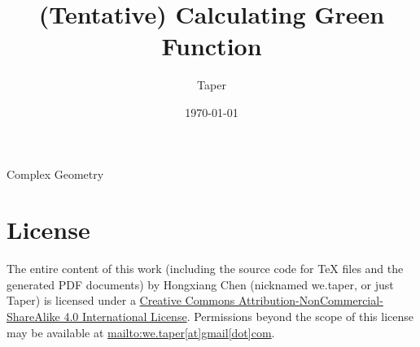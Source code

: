 \documentclass{book}
\title{(Tentative) Calculating Green Function}
\date{\today}
\author{Taper}
\numberwithin{equation}{subsection} %
\theoremstyle{definition}
\begin{document}
\maketitle
{}
\tableofcontents


\begin{thebibliography}{1}
     Complex Geometry
\end{thebibliography}
\chapter{License}
The entire content of this work (including the source code
for TeX files and the generated PDF documents) by 
Hongxiang Chen (nicknamed we.taper, or just Taper) is
licensed under a 
\href{http://creativecommons.org/licenses/by-nc-sa/4.0/}{Creative 
Commons Attribution-NonCommercial-ShareAlike 4.0 International 
License}. Permissions beyond the scope of this 
license may be available at \url{mailto:we.taper[at]gmail[dot]com}.
\end{document}
